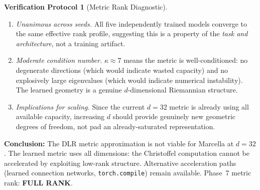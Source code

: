 \documentclass[11pt,a4paper]{article}
\theoremstyle{definition}
\newtheorem{protocol}[theorem]{Verification Protocol}
\theoremstyle{remark}
\begin{document}
\begin{protocol}[Metric Rank Diagnostic]
\begin{enumerate}[nosep]
  \item \emph{Unanimous across seeds.} All five independently 
  trained models converge to the same effective rank profile, 
  suggesting this is a property of the \emph{task and 
  architecture}, not a training artifact.

  \item \emph{Moderate condition number.} $\kappa \approx 7$ 
  means the metric is well-conditioned: no degenerate directions 
  (which would indicate wasted capacity) and no explosively large 
  eigenvalues (which would indicate numerical instability). The 
  learned geometry is a genuine $d$-dimensional Riemannian structure.

  \item \emph{Implications for scaling.} Since the current 
  $d = 32$ metric is already using all available capacity, 
  increasing $d$ should provide genuinely new geometric degrees 
  of freedom, not pad an already-saturated representation.
\end{enumerate}

\textbf{Conclusion:} The DLR metric approximation is not viable 
for Marcella at $d = 32$. The learned metric uses all dimensions: 
the Christoffel computation cannot be accelerated by exploiting 
low-rank structure. Alternative acceleration paths (learned 
connection networks, \texttt{torch.compile}) remain available.
Phase~7 metric rank: \textbf{FULL RANK}.
\end{protocol}


\end{document}
